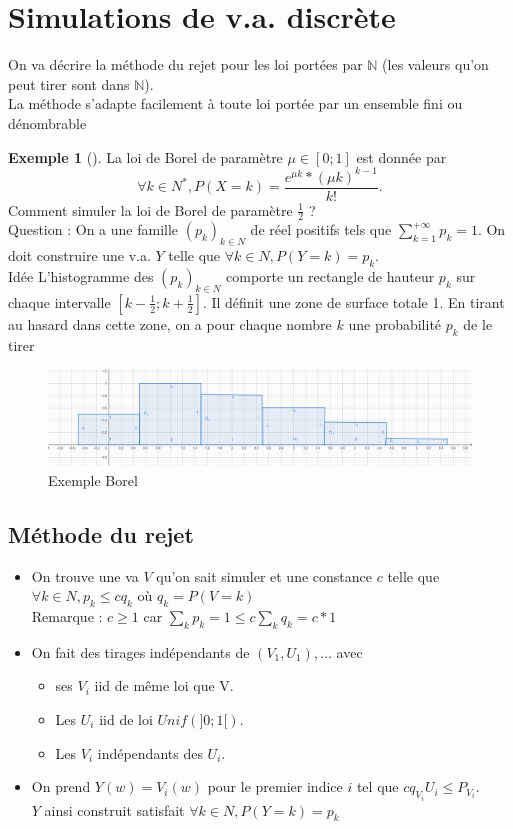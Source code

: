 \documentclass{article}
\theoremstyle{plain}%
\theoremstyle{definition}
\newtheorem{exmp}{Exemple}[section]
\theoremstyle{remark}
\begin{document}
\section{Simulations de v.a. discrète}
On va décrire la méthode du rejet pour les loi portées par $ \mathbb{N} $ (les valeurs qu'on peut tirer sont dans $ \mathbb{N} $). \\
La méthode s'adapte facilement à toute loi portée par un ensemble fini ou dénombrable
\begin{exmp}[]
	La loi de Borel de paramètre $ \mu \in [0;1] $ est donnée par 
	\[
		\forall k \in N^*, P(X=k) = \frac{e^{\mu k}*(\mu k)^{k-1}}{k!}
	.\]
	Comment simuler la loi de Borel de paramètre $ \frac{1}{2} $ ?\\
	Question : On a une famille $ (p_k)_{k \in N} $ de réel positifs tels que $ \sum_{k=1}^{+\infty} p_k=1 $. On doit construire une v.a. $ Y $ telle que $ \forall k \in N, P(Y=k) = p_k$. \\
	Idée  L'histogramme des $ (p_k)_{k \in N} $ comporte un rectangle de hauteur $ p_k $ sur chaque intervalle $ [k-\frac{1}{2};k+\frac{1}{2}] $. Il définit une zone de surface totale 1. En tirant au hasard dans cette zone, on a pour chaque nombre $ k $ une probabilité $ p_k $ de le tirer 
	\begin{figure}[htbp]
		\centering
		\includegraphics*[width=.80\textwidth]{figures2/fig3.png}
		\caption{Exemple Borel}
		\label{fig3}
	\end{figure} 
\end{exmp}

\subsection{Méthode du rejet}
\begin{itemize}
	\item On trouve une va $ V $ qu'on sait simuler et une constance $ c $ telle que $ \forall k \in N, p_k \leq c q_k $ où $ q_k = P(V=k) $\\
	Remarque : $ c \geq 1 $ car $ \sum_{k}^{}p_k =1  \leq c \sum_{k}^{}q_k = c *1$
	
	\item On fait des tirages indépendants de $ (V_1,U_1), \dots $ avec \begin{itemize}
		\item ses $ V_i $ iid de même loi que V.
		\item Les $ U_i $ iid de loi $ Unif(]0;1[) $.
		\item Les $ V_i $ indépendants des $ U_i $.
	\end{itemize}
	
	\item On prend $ Y(w) = V_i(w) $ pour le premier indice $ i $ tel que $ c q_{V_i} U_i \leq P_{V_i}$. \\
	$ Y $ ainsi construit satisfait $ \forall k \in N, P(Y=k) = p_k $  
\end{itemize}
\end{document}
